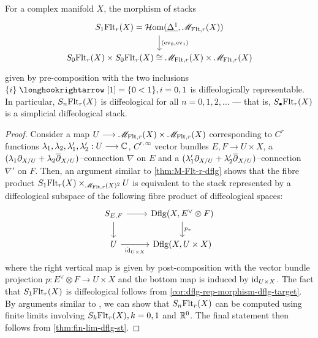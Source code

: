 \documentclass[11pt]{amsart}
\begin{document}
\begin{thm}\label{thm:simplicial-filtration-dflg}
For a complex manifold $X$, the morphism of stacks
\[\begin{tikzcd}
S_1\Flt_r(X) = \HHom(\ul{\Delta^1}, \sM_{\Flt, r}(X)) \ar[d, "{(\ev_0, \ev_1)}"] \\
S_0\Flt_r(X) \times S_0\Flt_r(X) \cong \sM_{\Flt, r}(X) \times \sM_{\Flt, r}(X)
\end{tikzcd}\]
given by pre-composition with the two inclusions
$\set{i} \hto \sbr{1} = \set{0 < 1}, i = 0 , 1$ is diffeologically representable.
In particular, $S_n\mathrm{Flt}_r(X)$ is diffeological for all $n = 0, 1, 2, \dots$ --- that is,
$S_\bullet\mathrm{Flt}_r(X)$ is a simplicial diffeological stack.
\end{thm}
\begin{proof}
Consider a map $U \to \sM_{\Flt, r}(X) \times \sM_{\Flt, r}(X)$ corresponding to
$C^{r}$ functions $\lambda_1, \lambda_2, \lambda'_1, \lambda'_2 : U \to \bC$,
$C^{r, \infty}$ vector bundles $E, F \to U \times X$, a
$(\lambda_1\partial_{X/U} + \lambda_2\overline{\partial}_{X/U})$--connection $\nabla$ on $E$ and
a $(\lambda'_1\partial_{X/U} + \lambda'_2\overline{\partial}_{X/U})$--connection $\nabla'$ on $F$.
Then, an argument similar to \cref{thm:M-Flt-r-dflg} shows that
the fibre product $S_1\mathrm{Flt}_r(X) \times_{\mathscr{M}_{\mathrm{Flt}, r}(X)^2} U$ is equivalent to the stack
represented by a diffeological subspace of the following fibre product of diffeological spaces:
\[\begin{tikzcd}
S_{E, F} \ar[r] \ar[d] & \Dflg(X, E^\vee \otimes F) \ar[d, "p_*"] \\
U \ar[r, "\hat{\id}_{U \times X}" below] & \Dflg(X, U \times X)
\end{tikzcd}\]
where the right vertical map is given by post-composition with the vector bundle projection
$p : E^\vee \otimes F \to U \times X$ and the bottom map is induced by $\mathrm{id}_{U \times X}$.
The fact that $S_1\mathrm{Flt}_r(X)$ is diffeological follows from
\cref{cor:dflg-rep-morphism-dflg-target}.
By arguments similar to \cite[\S 4]{ModStQuivBun}, we can show that $S_n\mathrm{Flt}_r(X)$ can be computed
using finite limits involving $S_k\mathrm{Flt}_r(X), k = 0, 1$ and $\mathbb{R}^0$.
The final statement then follows from \cref{thm:fin-lim-dflg-st}.
\end{proof}
\end{document}

